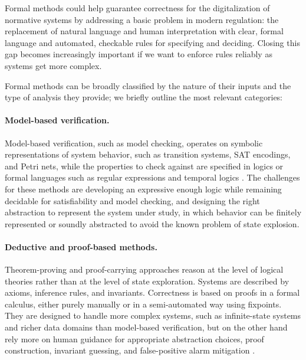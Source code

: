 Formal methods could help guarantee correctness for the digitalization of normative systems by addressing a basic problem in modern regulation: the replacement of natural language and human interpretation with clear, formal language and automated, checkable rules for specifying and deciding. Closing this gap becomes increasingly important if we want to enforce rules reliably as systems get more complex.

Formal methods can be broadly classified by the nature of their inputs and the type of analysis they provide; we briefly outline the most relevant categories:

\paragraph{Model-based verification.}

Model-based verification, such as model checking, operates on symbolic representations of system behavior, such as transition systems, SAT encodings, and Petri nets, while the properties to check against are specified in logics or formal languages such as regular expressions and temporal logics \cite{DBLP:journals/cacm/ClarkeES09, DBLP:books/daglib/0020348}. The challenges for these methods are developing an expressive enough logic while remaining decidable for satisfiability and model checking, and designing the right abstraction to represent the system under study, in which behavior can be finitely represented or soundly abstracted to avoid the known problem of state explosion. 

\paragraph{Deductive and proof-based methods.}

Theorem-proving and proof-carrying approaches reason at the level of logical theories rather than at the level of state exploration. Systems are described by axioms, inference rules, and invariants. Correctness is based on proofs in a formal calculus, either purely manually or in a semi-automated way using fixpoints. They are designed to handle more complex systems, such as infinite-state systems and richer data domains than model-based verification, but on the other hand rely more on human guidance for appropriate abstraction choices, proof construction, invariant guessing, and false-positive alarm mitigation \cite{DBLP:books/sp/93/Hoare93,DBLP:books/ph/Dijkstra76,DBLP:conf/popl/CousotC77}.

